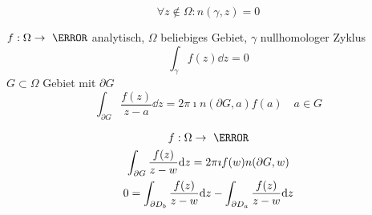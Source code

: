\begin{def*}[note = nullhomologer Zyklus , index = nullhomologer Zyklus , indexformat = {2!1 }]
	\[ \forall z \notin \Omega : n(\gamma , z) = 0 \]
\end{def*}

$f: \Omega \rightarrow \C$ analytisch, $\Omega$ beliebiges Gebiet, $\gamma$ nullhomologer Zyklus \\
\[ \int_\gamma f(z) \dd z = 0 \]
$G \subset \Omega$ Gebiet mit $\partial G$
\[ \int_{\partial G} \frac{f(z)}{z-a} \dd z =2\pi\imath n( \partial G , a ) f(a) \quad a \in G \]

\begin{gather*}
	f: \Omega \rightarrow \C \\
	\int_{\partial G} \frac{f(z)}{z-w} \dd z = 2\pi\imath f(w) n( \partial G , w ) \\
	0 = \int_{\partial D_b} \frac{f(z)}{z-w} \dd z - \int_{\partial D_a} \frac{f(z)}{z-w} \dd z
\end{gather*}

